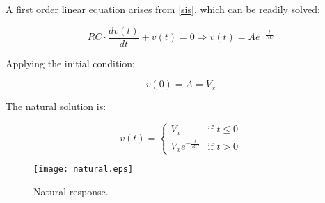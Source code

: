 A first order linear equation arises from \ref{sis}, which can be readily solved:

\begin{equation}
  RC \cdot \frac{dv(t)}{dt} + v(t) = 0 \Rightarrow v(t) = Ae^{-\frac{t}{RC}}
\end{equation}

Applying the initial condition:

\begin{equation}
  v(0) = A = V_x
\end{equation}

The natural solution is:

\begin{equation}
  \label{nat_sol} v(t) =
  \begin{cases}
    V_x & \mbox{if } t \leq 0 \\
    V_xe^{-\frac{t}{RC}} & \mbox{if } t > 0
  \end{cases}
\end{equation}

\begin{figure}[H]
  \centering
  \texttt{[image: natural.eps]}
  \caption{Natural response.}
  \label{fig:nat}
\end{figure}
